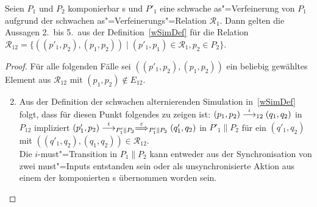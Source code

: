 \begin{Lem}
  \label{schwVerfParallelLem}
  Seien $P_1$ und $P_2$ komponierbar \MEIO{}s und $P'_1$ eine schwache
  as"=Verfeinerung von $P_1$ aufgrund der schwachen as"=Verfeinerungs"=Relation
  $\mathcal{R}_1$. Dann gelten die Aussagen 2.\ bis 5.\ aus der
  Definition~\ref{wSimDef} für die Relation $\mathcal{R}_{12} =
  \{((p'_1,p_2),(p_1,p_2))\mid (p'_1,p_1)\in\mathcal{R}_1, p_2\in P_2\}$.
\end{Lem}
\begin{proof}
  Für alle folgenden Fälle sei $((p'_1,p_2),(p_1,p_2))$ ein beliebig gewähltes
  Element aus $\mathcal{R}_{12}$ mit $(p_1,p_2)\notin E_{12}$.
  \begin{enumerate}
    \setcounter{enumi}{1}
    \item Aus der Definition der schwachen alternierenden
      Simulation in~\ref{wSimDef} folgt, dass für diesen Punkt folgendes zu
      zeigen ist: $(p_1,p_2)\must[i]_{12}(q_1,q_2)$ in $P_{12}$ impliziert
      $(p'_1,p_2) \must[i]_{P'_1\|P_2} \weakmust[\varepsilon]_{P'_1\|P_2}
      (q'_1,q_2)$ in $P'_1\|P_2$ für ein $(q'_1,q_2)$ mit
      $((q'_1,q_2),(q_1,q_2)) \in \mathcal{R}_{12}$.\\
      Die $i$-must"=Transition in $P_1\|P_2$ kann entweder aus der
      Synchronisation von zwei must"=Inputs entstanden sein oder als
      unsynchronisierte Aktion aus einem der komponierten \MEIO{}s übernommen
      worden sein.
\end{enumerate}
\end{proof}
